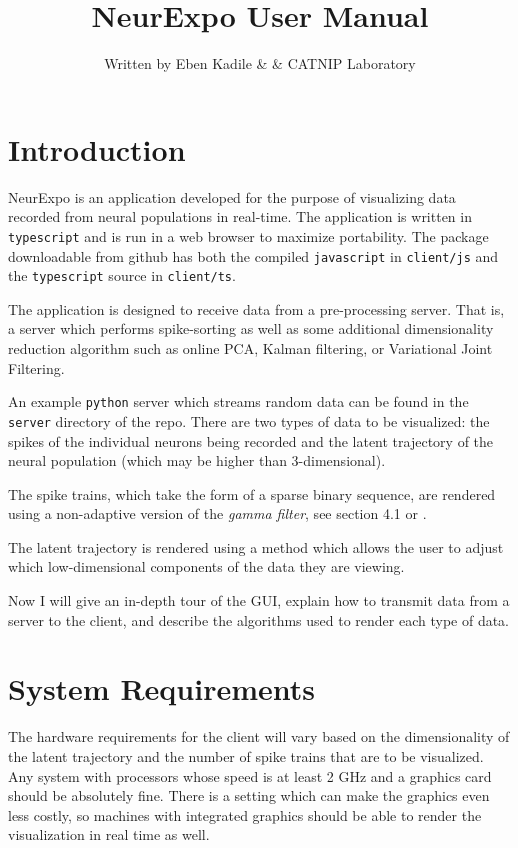 \documentclass[12pt, openany]{book}
\title{NeurExpo User Manual}
\author{Written by Eben Kadile & \newline & CATNIP Laboratory}
\date{}
\begin{document}
\pagestyle{fancy}
\fancyhf{}

\maketitle

\tableofcontents

\newpage

\section{Introduction}

NeurExpo is an application developed for the purpose of visualizing data recorded from neural populations in real-time. The application is written in \texttt{typescript} and is run in a web browser to maximize portability. The package downloadable from github has both the compiled \texttt{javascript} in \texttt{client/js} and the \texttt{typescript} source in \texttt{client/ts}.

The application is designed to receive data from a pre-processing server. That is, a server which performs spike-sorting as well as some additional dimensionality reduction algorithm such as online PCA, Kalman filtering, or Variational Joint Filtering.

An example \texttt{python} server which streams random data can be found in the \texttt{server} directory of the repo. There are two types of data to be visualized: the spikes of the individual neurons being recorded and the latent trajectory of the neural population (which may be higher than 3-dimensional).

The spike trains, which take the form of a sparse binary sequence, are rendered using a non-adaptive version of the \textit{gamma filter}, see section 4.1 or \cite{gammafilter}.

The latent trajectory is rendered using a method which allows the user to adjust which low-dimensional components of the data they are viewing.

Now I will give an in-depth tour of the GUI, explain how to transmit data from a server to the client, and describe the algorithms used to render each type of data.

\section{System Requirements}

The hardware requirements for the client will vary based on the dimensionality of the latent trajectory and the number of spike trains that are to be visualized. Any system with processors whose speed is at least 2 GHz and a graphics card should be absolutely fine. There is a setting which can make the graphics even less costly, so machines with integrated graphics should be able to render the visualization in real time as well.
\end{document}
